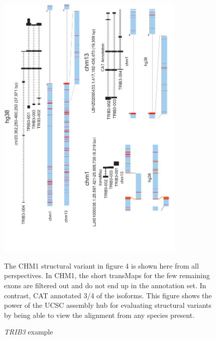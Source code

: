 \documentclass[fleqn,10pt]{wlscirep}
\begin{document}
\begin{figure}
\centering
\includegraphics[width=0.8\textwidth,height=0.7\textheight,keepaspectratio]{trib3_full.pdf}
\caption{\textit{TRIB3} example}
The CHM1 structural variant in figure 4 is shown here from all perspectives. In CHM1, the short transMaps for the few remaining exons are filtered out and do not end up in the annotation set. In contrast, CAT annotated 3/4 of the isoforms. This figure shows the power of the UCSC assembly hub for evaluating structural variants by being able to view the alignment from any species present.
\label{supp_fig:trib3}
\end{figure}
\end{document}
